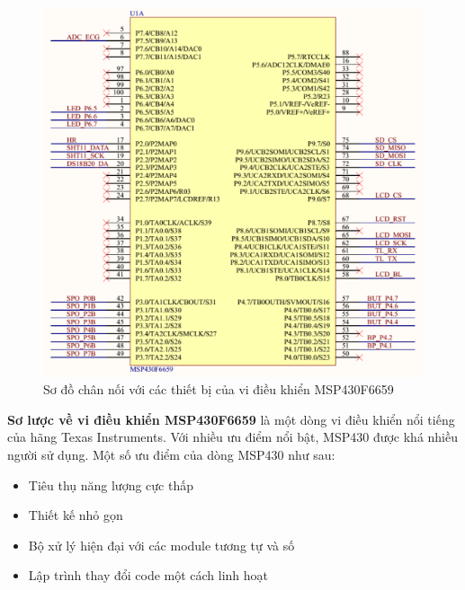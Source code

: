 \documentclass{report}
\begin{document}
\newpage
\begin{figure}[h]
	\centering
	\includegraphics[scale = 0.9]{fig42.png}
	\caption{Sơ đồ chân nối với các thiết bị của vi điều khiển MSP430F6659}
	\label{fig:Graph42}
\end{figure}
\textbf{Sơ lược về vi điều khiển MSP430F6659} là một dòng vi điều khiển nổi tiếng của hãng Texas
Instruments. Với nhiều ưu điểm nổi bật, MSP430 được khá nhiều người sử dụng. Một số ưu
điểm của dòng MSP430 như sau:
\begin{itemize}
	\item Tiêu thụ năng lượng cực thấp
	\item Thiết kế nhỏ gọn
	\item Bộ xử lý hiện đại với các module tương tự và số
	\item Lập trình thay đổi code một cách linh hoạt
\end{itemize}
\newpage
\end{document}
